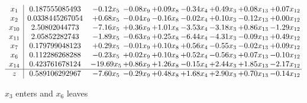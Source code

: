 \documentclass[8pt]{article}
\begin{document}
 \[\begin{array}{c| c c@{\hskip 2pt} c@{\hskip 2pt} c@{\hskip 2pt} c@{\hskip 2pt} c@{\hskip 2pt} c@{\hskip 2pt} c@{\hskip 2pt} }
 x_{1}   &  0.187555085493 & -0.12 x_{5} & -0.08 x_{9} & +  0.09 x_{8} & -0.34 x_{4} & +  0.49 x_{3} & +  0.08 x_{13} & +  0.07 x_{12}\\
 x_{2}   &  0.0338445267054 & +  0.68 x_{5} & -0.04 x_{9} & -0.16 x_{8} & -0.02 x_{4} & +  0.10 x_{3} & -0.12 x_{13} & +  0.00 x_{12}\\
 x_{10}   &  2.50802044773 & -7.16 x_{5} & +  0.36 x_{9} & +  1.01 x_{8} & -3.53 x_{4} & -3.18 x_{3} & +  0.86 x_{13} & -1.29 x_{12}\\
 x_{11}   &  2.05852282743 & -1.89 x_{5} & -0.63 x_{9} & +  0.25 x_{8} & -6.44 x_{4} & -4.31 x_{3} & -0.09 x_{13} & +  0.49 x_{12}\\
 x_{7}   &  0.179799048123 & +  0.29 x_{5} & -0.01 x_{9} & +  0.10 x_{8} & +  0.56 x_{4} & -0.55 x_{3} & -0.02 x_{13} & +  0.09 x_{12}\\
 x_{6}   &  0.112286268288 & -0.23 x_{5} & +  0.02 x_{9} & +  0.10 x_{8} & +  0.52 x_{4} & -0.56 x_{3} & +  0.07 x_{13} & -0.10 x_{12}\\
 x_{14}   &  0.423761678124 & -19.69 x_{5} & +  0.86 x_{9} & +  1.26 x_{8} & -0.15 x_{4} & +  2.44 x_{3} & +  1.85 x_{13} & -2.17 x_{12}\\
\hline
z    &  0.589106292967 & -7.60 x_{5} & -0.29 x_{9} & +  0.48 x_{8} & +  1.68 x_{4} & +  2.90 x_{3} & +  0.70 x_{13} & -0.14 x_{12}\\
\end{array}\]


 $ x_{3} $ enters and $ x_{6} $ leaves 
\end{document}
